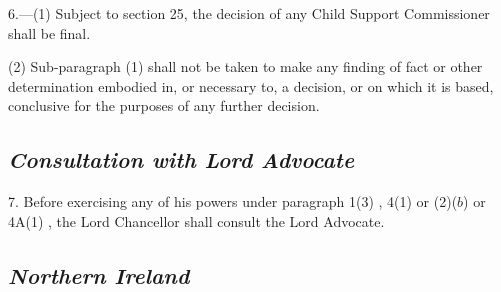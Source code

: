 \documentclass[12pt,a4paper]{article}
\begin{document}
6.---(1) Subject to section 25, the decision of any Child Support Commissioner shall be final.

(2) Sub-paragraph (1)  shall not be taken to make any finding of fact or other determination embodied in, or necessary to, a decision, or on which it is based, conclusive for the purposes of any further decision.



\subsection*{\itshape Consultation with Lord Advocate}

7. Before exercising any of his powers under 
paragraph 1(3)%
, 
4(1) or (2)($b$) or 4A(1)%
, the Lord Chancellor shall consult the Lord Advocate.


\subsection*{\itshape Northern Ireland}
\end{document}
